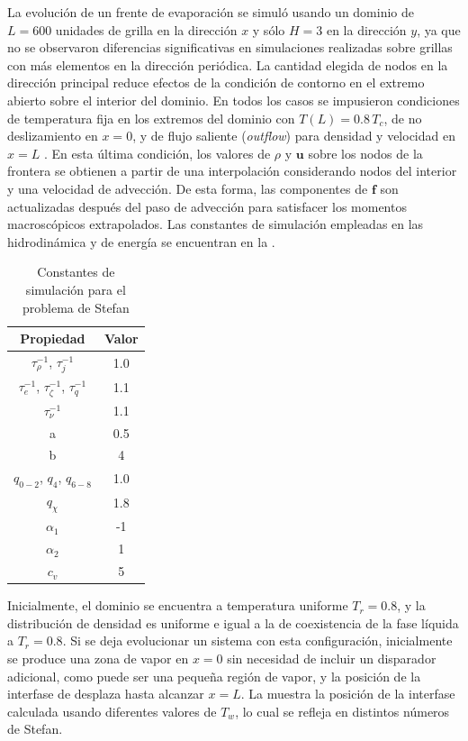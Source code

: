 La evoluci\'on de un frente de evaporaci\'on se simul\'o usando un dominio de $L=600$ unidades de grilla en la direcci\'on $x$ y s\'olo $H=3$ en la direcci\'on $y$, ya que no se observaron diferencias significativas en simulaciones realizadas sobre grillas con m\'as elementos en la direcci\'on peri\'odica. La cantidad elegida de nodos en la direcci\'on principal reduce efectos de la condici\'on de contorno en el extremo abierto sobre el interior del dominio. En todos los casos se impusieron condiciones de temperatura fija en los extremos del dominio con $T(L) = 0.8 \, T_c$, de no deslizamiento en $x=0$, y de flujo saliente (\emph{outflow}) para densidad y velocidad en $x=L$ \cite{lou_evaluation_2013}. En esta \'ultima condici\'on, los valores de $\rho$ y $\bm{u}$ sobre los nodos de la frontera se obtienen a partir de una interpolaci\'on considerando nodos del interior y una velocidad de advecci\'on. De esta forma, las componentes de $\bm{f}$ son actualizadas despu\'es del paso de advecci\'on para satisfacer los momentos macrosc\'opicos extrapolados. Las constantes de simulaci\'on empleadas en las \lbe{} hidrodin\'amica y de energ\'ia se encuentran en la .
\begin{table}[ht]
	\centering
    \begin{tabular}{c c}
	    \toprule
        \bf Propiedad & \bf Valor \\
        \midrule
        $\tau_{\rho}^{-1}$, $\tau_{j}^{-1}$ & 1.0\\
        $\tau_{e}^{-1}$, $\tau_{\zeta}^{-1}$, $\tau_{q}^{-1}$ & 1.1 \\
        $\tau_{\nu}^{-1}$ & 1.1 \\
		a & 0.5 \\
		b & 4 \\
		$q_{0-2}$, $q_4$, $q_{6-8}$ & 1.0 \\
		$q_{\chi}$ & 1.8 \\
		$\alpha_1$ & -1 \\
		$\alpha_2$ & 1 \\
		$c_v$ & 5 \\
        \bottomrule
	\end{tabular}
	\caption{Constantes de simulaci\'on para el problema de Stefan}
	\label{tab:stef_2d_prop}
\end{table} 

Inicialmente, el dominio se encuentra a temperatura uniforme $T_r = 0.8$, y la distribuci\'on de densidad es uniforme e igual a la de coexistencia de la fase l\'iquida a $T_r = 0.8$. Si se deja evolucionar un sistema con esta configuraci\'on, inicialmente se produce una zona de vapor en $x=0$ sin necesidad de incluir un disparador adicional, como puede ser una peque\~na regi\'on de vapor, y la posici\'on de la interfase de desplaza hasta alcanzar $x=L$. La  muestra la posici\'on de la interfase calculada usando diferentes valores de $T_w$, lo cual se refleja en distintos n\'umeros de Stefan. 

